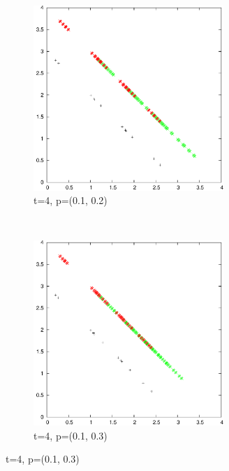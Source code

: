 \documentclass{article}
\begin{document}
	\begin{figure}
		\centering
		\begin{subfigure}[b]{0.45\textwidth}
			\centering
			\includegraphics[width=\textwidth,height=7cm,keepaspectratio]{images/t4_12}
			\caption{t=4, p=(0.1, 0.2)}
			\label{fig:t4_12}
		\end{subfigure}
		~
		\begin{subfigure}[b]{0.45\textwidth}
			\centering
			\includegraphics[width=\textwidth,height=7cm,keepaspectratio]{images/t4_13}
			\caption{t=4, p=(0.1, 0.3)}
			\label{fig:t4_13}
		\end{subfigure}


\end{figure}
\end{document}
